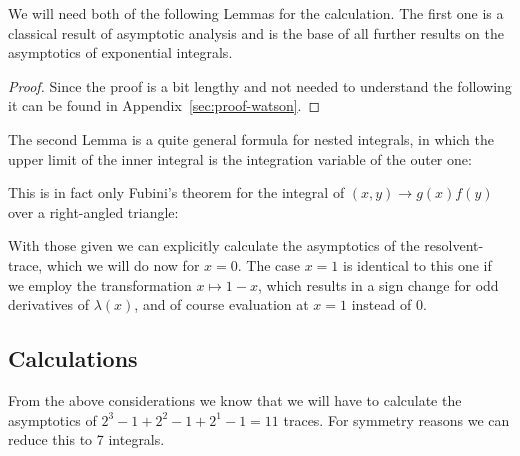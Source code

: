 We will need both of the following Lemmas for the calculation. The first one is
a classical result of asymptotic analysis and is the base of all further results
on the asymptotics of exponential integrals.
\begin{Lemma}[Watson]
  
  \begin{proof}
    Since the proof is a bit lengthy and not needed to understand the following
    it can be found in Appendix~\ref{sec:proof-watson}.
  \end{proof}
\end{Lemma}

The second Lemma is a quite general formula for nested integrals, in which the
upper limit of the inner integral is the integration variable of the outer one:

\begin{Remark}
  This is in fact only Fubini's theorem for the integral of $(x,y)\to g(x)f(y)$
  over a right-angled triangle:
  \begin{center}
  \end{center}
\end{Remark}

With those given we can explicitly calculate the asymptotics of the
resolvent-trace, which we will do now for $x=0$. The case $x=1$ is identical to
this one if we employ the transformation $x\mapsto 1-x$, which results in a sign
change for odd derivatives of $\lambda(x)$, and of course evaluation at $x=1$
instead of $0$.

\subsection{Calculations}
From the above considerations we know that we will have to calculate the
asymptotics of $2^3 - 1 + 2^2 - 1 + 2^1 - 1 = 11$ traces. For symmetry reasons
we can reduce this to 7 integrals.

